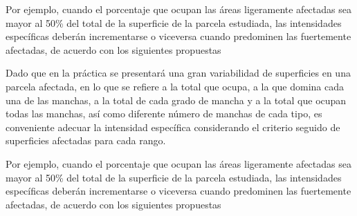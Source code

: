 Por ejemplo, cuando el porcentaje que ocupan las áreas ligeramente afectadas sea mayor al 50\% del total de la superficie de la parcela estudiada, las intensidades específicas deberán incrementarse o viceversa cuando predominen las fuertemente afectadas, de acuerdo con los siguientes propuestas

Dado que en la práctica se presentará una gran variabilidad de superficies en una parcela afectada, en lo que se refiere a la total que ocupa, a la que domina cada una de las manchas, a la total de cada grado de mancha y a la total que ocupan todas las manchas, así como diferente número de manchas de cada tipo, es conveniente adecuar la intensidad específica considerando el criterio seguido de superficies afectadas para cada rango.

Por ejemplo, cuando el porcentaje que ocupan las áreas ligeramente afectadas sea mayor al 50\% del total de la superficie de la parcela estudiada, las intensidades específicas deberán incrementarse o viceversa cuando predominen las fuertemente afectadas, de acuerdo con los siguientes propuestas
